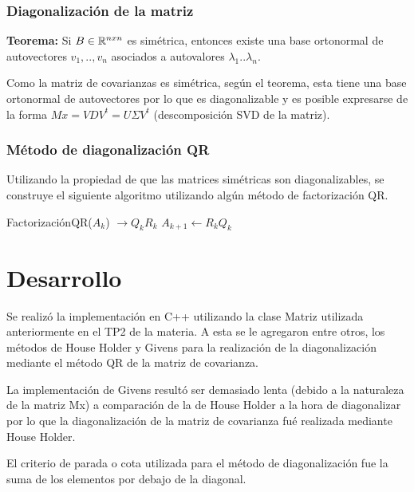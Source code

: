 \documentclass[a4paper,10pt,twoside]{article}
\begin{document}
\subsubsection{Diagonalización de la matriz}
\textbf{Teorema:}
Si $\mathnormal{B} \in \mathbb{R}^{nxn}$ es simétrica, entonces existe una base ortonormal de autovectores ${v_1,..,v_n}$ asociados a autovalores $\lambda_1 .. \lambda_n$.

Como la matriz de covarianzas es simétrica, según el teorema, esta tiene una base ortonormal de autovectores por lo que es diagonalizable y es posible expresarse de la forma $Mx = VDV^{t} = U \Sigma V^{t}$ (descomposición SVD de la matriz).

\subsubsection{Método de diagonalización QR}
Utilizando la propiedad de que las matrices simétricas son diagonalizables, se construye el siguiente algoritmo utilizando algún método de factorización QR.

\begin{algorithmic}
		\STATE FactorizaciónQR($A_k$) $\rightarrow Q_k R_k$
		\STATE $A_{k+1} \leftarrow R_k Q_k$
	\ENDWHILE
\end{algorithmic}




\section{Desarrollo}
Se realizó la implementación en C++ utilizando la clase Matriz utilizada anteriormente en el TP2 de la materia. A esta se le agregaron entre otros, los métodos de House Holder y Givens para la realización de la diagonalización mediante el método QR de la matriz de covarianza.

La implementación de Givens resultó ser demasiado lenta (debido a la naturaleza de la matriz Mx) a comparación de la de House Holder a la hora de diagonalizar por lo que la diagonalización de la matriz de covarianza fué realizada mediante House Holder.

El criterio de parada o cota utilizada para el método de diagonalización fue la suma de los elementos por debajo de la diagonal.
\end{document}

